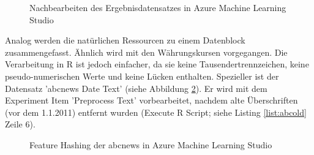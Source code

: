 \begin{figure}[H]
\centering
{}
\caption{Nachbearbeiten des Ergebnisdatensatzes in Azure Machine Learning Studio}
\label{fig:indicesAzure_2}
\end{figure}
Analog werden die natürlichen Ressourcen zu einem Datenblock zusammengefasst. Ähnlich wird mit den Währungskursen vorgegangen. Die Verarbeitung in R ist jedoch einfacher, da sie keine Tausendertrennzeichen, keine pseudo-numerischen Werte und keine Lücken enthalten. 
Spezieller ist der Datensatz 'abcnews \textunderscore Date \textunderscore Text' (siehe Abbildung \ref{fig:abcAzure1}). Er wird mit dem Experiment Item 'Preprocess Text' vorbearbeitet, nachdem alte Überschriften (vor dem 1.1.2011) entfernt wurden (Execute R Script; siehe Listing \ref{list:abcold} Zeile 6). 
\begin{figure}[H]
\centering
{}
\caption{Feature Hashing der abcnews in Azure Machine Learning Studio}
\label{fig:abcAzure1}
\end{figure}
